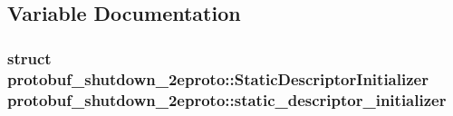\subsection{Variable Documentation}
\subsubsection[{\texorpdfstring{static\+\_\+descriptor\+\_\+initializer}{static_descriptor_initializer}}]{\setlength{\rightskip}{0pt plus 5cm}struct {\bf protobuf\+\_\+shutdown\+\_\+2eproto\+::\+Static\+Descriptor\+Initializer}  protobuf\+\_\+shutdown\+\_\+2eproto\+::static\+\_\+descriptor\+\_\+initializer}\hypertarget{namespaceprotobuf__shutdown__2eproto_a01dfcfafd9651753066e44cd04be244d}{}\label{namespaceprotobuf__shutdown__2eproto_a01dfcfafd9651753066e44cd04be244d}
